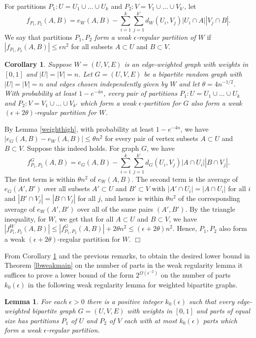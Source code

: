 \documentclass[11pt]{article}
\newtheorem{lemma}{Lemma}[section]
\newtheorem{corollary}{Corollary}[section]
\newenvironment{proof}
      {\medskip\noindent{\bf Proof:}\hspace{1mm}}
      {\hfill$\Box$\medskip}
\begin{document}
For partitions $P_1:U=U_1 \cup \ldots \cup U_k$ and $P_2:V=V_1 \cup \ldots \cup
V_{k'}$, let
$$f_{P_1,P_2}(A,B)=e_W(A,B)-\sum_{i=1}^k\sum_{j=1}^{k'}d_W(U_i,V_j)|U_i \cap
A||V_j \cap B|.$$  We say that partitions $P_1,P_2$ {\it form a weak
$\epsilon$-regular partition of $W$} if $|f_{P_1,P_2}(A,B)| \leq \epsilon n^2$
for all subsets $A \subset U$ and $B \subset V$.

\begin{corollary}\label{weightunweight}
Suppose $W=(U,V,E)$ is an edge-weighted graph with weights in $[0,1]$ and
$|U|=|V|=n$. Let $G=(U,V,E)$ be a bipartite random graph with $|U|=|V|=n$ and
edges chosen independently given by $W$ and let $\theta=4n^{-1/2}$. With
probability at least $1-e^{-4n}$, every pair of partitions $P_1:U=U_1 \cup
\ldots \cup U_k$ and $P_2:V=V_1 \cup \ldots \cup V_{k'}$ which form a weak
$\epsilon$-partition for $G$ also form a weak $(\epsilon+2\theta)$-regular
partition for $W$.
\end{corollary}
\begin{proof}
By Lemma \ref{weighthigh}, with probability at least $1-e^{-4n}$, we have
$|e_G(A,B)-e_W(A,B)| \leq \theta n^2$ for every pair of vertex subsets $A
\subset U$ and $B \subset V$. Suppose this indeed holds.
For graph $G$, we have
$$f_{P_1,P_2}^G(A,B)=e_{G}(A,B)-\sum_{i=1}^k\sum_{j=1}^{k'}d_G(U_i,V_j)|A \cap
U_i||B \cap V_j|.$$
The first term is within $\theta n^2$ of $e_W(A,B)$. The second term is the
average of $e_{G}(A',B')$ over all subsets $A' \subset U$ and $B' \subset V$
with $|A' \cap U_i|=|A \cap U_i|$ for all $i$ and $|B' \cap V_j|=|B \cap V_j|$
for all $j$, and hence is within $\theta n^2$ of the corresponding average of
$e_W(A',B')$ over all of the same pairs $(A',B')$. By the triangle inequality,
for $W$, we get that for all $A \subset U$ and $B \subset V$, we have
$|f_{P_1,P_2}^W(A,B)| \leq |f_{P_1,P_2}^G(A,B)|+2\theta n^2 \leq
(\epsilon+2\theta)n^2$. Hence, $P_1,P_2$ also form a weak
$(\epsilon+2\theta)$-regular partition for $W$.
\end{proof}

From Corollary \ref{weightunweight} and the previous remarks, to obtain the
desired lower bound in Theorem \ref{lbweakmain} on the number of parts in the
weak regularity lemma it suffices to prove a lower bound of the form
$2^{\Omega(\epsilon^{-2})}$ on the number of parts $k_0(\epsilon)$ in the
following weak regularity lemma for weighted bipartite graphs.

\begin{lemma}\label{brlweight}
For each $\epsilon>0$ there is a positive integer $k_0(\epsilon)$ such that
every edge-weighted bipartite graph $G=(U,V,E)$ with weights in $[0,1]$ and
parts of equal size has partitions $P_1$ of $U$ and $P_2$ of $V$ each with at
most $k_0(\epsilon)$ parts  which form a weak $\epsilon$-regular partition.
\end{lemma}
\end{document}
